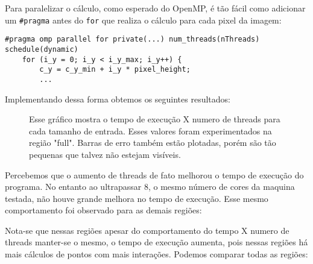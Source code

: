 \documentclass[12pt]{article}
\newcommand{\code}[1]{\texttt{#1}}
\begin{document}
Para paralelizar o cálculo, como esperado do OpenMP, é tão fácil como adicionar um \code{\#pragma} antes do \code{for} que realiza o cálculo para cada pixel da imagem:
\begin{lstlisting}[style=CStyle]
    #pragma omp parallel for private(...) num_threads(nThreads) schedule(dynamic)
    for (i_y = 0; i_y < i_y_max; i_y++) {
        c_y = c_y_min + i_y * pixel_height;
        ...
\end{lstlisting}

Implementando dessa forma obtemos os seguintes resultados:
\begin{figure}[H]
    \caption{Esse gráfico mostra o tempo de execução X numero de threads para cada tamanho de entrada. Esses valores foram experimentados na região "full". Barras de erro também estão plotadas, porém são tão pequenas que talvez não estejam visíveis.}
\end{figure}

Percebemos que o aumento de threads de fato melhorou o tempo de execução do programa. No entanto ao ultrapassar 8, o mesmo número de cores da maquina testada, não houve grande melhora no tempo de execução. Esse mesmo comportamento foi observado para as demais regiões:

\begin{figure}[H]
\end{figure}

\begin{figure}[H]
\end{figure}

\begin{figure}[H]
\end{figure}

Nota-se que nessas regiões apesar do comportamento do tempo X numero de threads manter-se o mesmo, o tempo de execução aumenta, pois nessas regiões há mais cálculos de pontos com mais interações. Podemos comparar todas as regiões:

\begin{figure}[H]
\end{figure}
\end{document}
